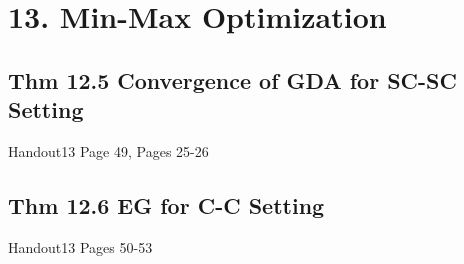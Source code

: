 \section*{13. Min-Max Optimization}
\subsection*{Thm 12.5 Convergence of GDA for SC-SC Setting}
Handout13 Page 49, Pages 25-26




\subsection*{Thm 12.6 EG for C-C Setting}
Handout13 Pages 50-53